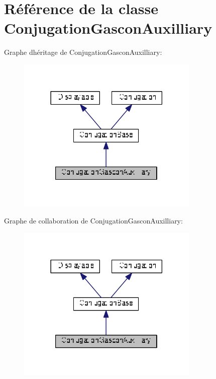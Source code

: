\hypertarget{class_conjugation_gascon_auxilliary}{}\section{Référence de la classe Conjugation\+Gascon\+Auxilliary}
\label{class_conjugation_gascon_auxilliary}


Graphe d\textquotesingle{}héritage de Conjugation\+Gascon\+Auxilliary\+:
\nopagebreak
\begin{figure}[H]
\begin{center}
\leavevmode
\includegraphics[width=246pt]{class_conjugation_gascon_auxilliary__inherit__graph}
\end{center}
\end{figure}


Graphe de collaboration de Conjugation\+Gascon\+Auxilliary\+:
\nopagebreak
\begin{figure}[H]
\begin{center}
\leavevmode
\includegraphics[width=246pt]{class_conjugation_gascon_auxilliary__coll__graph}
\end{center}
\end{figure}
